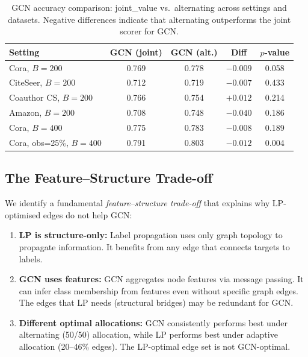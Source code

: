 \documentclass[12pt,a4paper,oneside]{report}
\begin{document}
\begin{table}[htbp]
\centering
\caption{GCN accuracy comparison: joint\_value vs.\ alternating across settings and datasets. Negative differences indicate that alternating outperforms the joint scorer for GCN.}
\label{tab:gcn}
\small
\begin{tabular}{lcccc}
\toprule
Setting & GCN (joint) & GCN (alt.) & Diff & $p$-value \\
\midrule
Cora, $B=200$        & 0.769 & 0.778 & $-0.009$ & 0.058 \\
CiteSeer, $B=200$    & 0.712 & 0.719 & $-0.007$ & 0.433 \\
Coauthor CS, $B=200$ & 0.766 & 0.754 & $+0.012$ & 0.214 \\
Amazon, $B=200$      & 0.708 & 0.748 & $-0.040$ & 0.186 \\
\midrule
Cora, $B=400$              & 0.775 & 0.783 & $-0.008$ & 0.189 \\
Cora, obs=25\%, $B=400$    & 0.791 & 0.803 & $-0.012$ & 0.004 \\
\bottomrule
\end{tabular}
\end{table}

\subsection{The Feature--Structure Trade-off}

We identify a fundamental \emph{feature--structure trade-off} that explains why LP-optimised edges do not help GCN:

\begin{enumerate}[leftmargin=2em]
    \item \textbf{LP is structure-only:} Label propagation uses only graph topology to propagate information. It benefits from any edge that connects targets to labels.

    \item \textbf{GCN uses features:} GCN aggregates node features via message passing. It can infer class membership from features even without specific graph edges. The edges that LP needs (structural bridges) may be redundant for GCN.

    \item \textbf{Different optimal allocations:} GCN consistently performs best under alternating (50/50) allocation, while LP performs best under adaptive allocation (20--46\% edges). The LP-optimal edge set is not GCN-optimal.
\end{enumerate}
\end{document}
